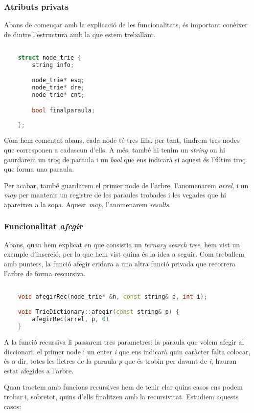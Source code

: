 \documentclass[titlepage]{article}
\begin{document}
\subsubsection{Atributs privats}

Abans de començar amb la explicació de les funcionalitats, és important conèixer de dintre l'estructura amb la que estem treballant.

\begin{lstlisting}[language=C++]

    struct node_trie {
        string info;

        node_trie* esq;
        node_trie* dre;
        node_trie* cnt;

        bool finalparaula;
        
    };
\end{lstlisting}

Com hem comentat abans, cada node té tres fills, per tant, tindrem tres nodes que corresponen a cadascun d'ells. A més, també hi tenim un \textit{string} on hi gaurdarem un troç de paraula i un \textit{bool} que ens indicarà si aquest és l'últim troç que forma una paraula. 
\newline\par
Per acabar, també guardarem el primer node de l'arbre, l'anomenarem \textit{arrel}, i un \textit{map} per mantenir un registre de les paraules trobades i les vegades que hi apareixen a la sopa. Aquest \textit{map}, l'anomenarem \textit{results}.

\subsubsection{Funcionalitat \textit{afegir}}

Abans, quan hem explicat en que consistia un \textit{ternary search tree}, hem vist un exemple d'inserció, per lo que hem vist quina és la idea a seguir. Com treballem amb punters, la funció afegir cridara a una altra funció privada que recorrera l'arbre de forma rescursiva.

\begin{lstlisting}[language=C++]

    void afegirRec(node_trie* &n, const string& p, int i); 

    void TrieDictionary::afegir(const string& p) {
        afegirRec(arrel, p, 0)
    }
\end{lstlisting}

A la funció recursiva li passarem tres parametres: la paraula que volem afegir al diccionari, el primer node i un enter \textit{i} que ens indicarà quin caràcter falta colocar, és a dir, totes les lletres de la paraula \textit{p} que és trobin per davant de \textit{i}, hauran estat afegides a l'arbre.
\newline\par
Quan tractem amb funcions recursives hem de tenir clar quins casos ens podem trobar i, sobretot, quins d'ells finalitzen amb la recursivitat. Estudiem aquests casos:
\end{document}
